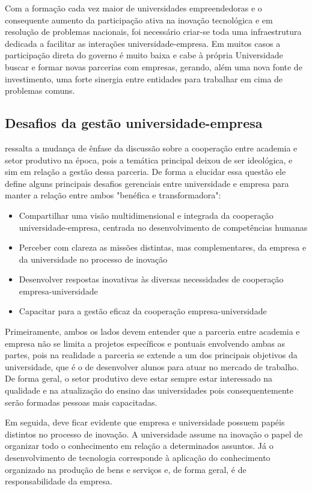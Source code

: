 Com a formação cada vez maior de universidades empreendedoras e o consequente aumento da participação ativa na inovação tecnológica e em resolução de problemas nacionais, foi necessário criar-se toda uma infraestrutura dedicada a facilitar as interações universidade-empresa. Em muitos casos a participação direta do governo é muito baixa e cabe à própria Universidade buscar e formar novas parcerias com empresas, gerando, além uma nova fonte de investimento, uma forte sinergia entre entidades para trabalhar em cima de problemas comuns.


\subsection{Desafios da gestão universidade-empresa}
\label{cha:univ_empreend}

 ressalta a mudança de ênfase da discussão sobre a cooperação entre academia e setor produtivo na época, pois a temática principal deixou de ser ideológica, e sim em relação a gestão dessa parceria. De forma a elucidar essa questão ele define alguns principais desafios gerenciais entre universidade e empresa para manter a relação entre ambos "benéfica e transformadora":

\begin{itemize}
\item Compartilhar uma visão multidimensional e integrada da cooperação universidade-empresa, centrada no desenvolvimento de competências humanas
\item Perceber com clareza as missões distintas, mas complementares, da empresa e da universidade no processo de inovação
\item Desenvolver respostas inovativas às diversas necessidades de cooperação empresa-universidade
\item Capacitar para a gestão eficaz da cooperação empresa-universidade
\end{itemize}

Primeiramente, ambos os lados devem entender que a parceria entre academia e empresa não se limita a projetos específicos e pontuais envolvendo ambas as partes, pois na realidade a parceria se extende a um dos principais objetivos da universidade, que é o de desenvolver alunos para atuar no mercado de trabalho. De forma geral, o setor produtivo deve estar sempre estar interessado na qualidade e na atualização do ensino das universidades pois consequentemente serão formadas pessoas mais capacitadas.

Em seguida, deve ficar evidente que empresa e universidade possuem papéis distintos no processo de inovação. A universidade assume na inovação o papel de organizar todo o conhecimento em relação a determinados assuntos. Já o desenvolvimento de tecnologia corresponde à aplicação do conhecimento organizado na produção de bens e serviços e, de forma geral, é de responsabilidade da empresa.

